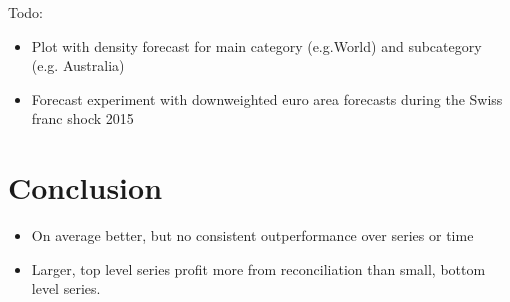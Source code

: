 \documentclass[a4paper,fleqn,11pt]{article}
\begin{document}
 Todo:
 \begin{itemize}
 	\item  Plot with density forecast for main category (e.g.World) and subcategory (e.g. Australia)
 	\item Forecast experiment with downweighted euro area forecasts during the Swiss franc shock 2015
 \end{itemize}


\clearpage

\section{Conclusion}

\begin{itemize}
	\item On average better, but no consistent outperformance over series or time
	\item Larger, top level series profit more from reconciliation than small, bottom level series.
\end{itemize}





\clearpage

\setcounter{page}{3}



\clearpage



\end{document}
